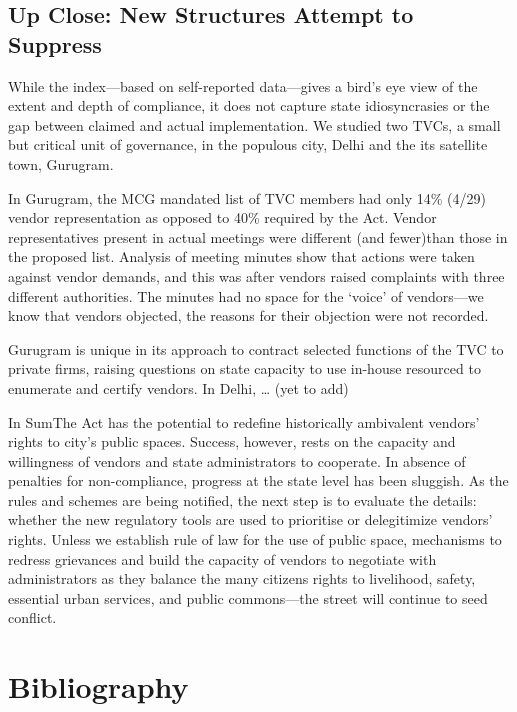 \documentclass[a4paper, 12pt, twoside]{article}
\begin{document}
{{\subsection*{Up Close: New Structures Attempt to Suppress}
While the index—based on self-reported data—gives a bird’s eye view of the extent and depth of compliance, it does not capture state idiosyncrasies or the gap between claimed and actual implementation. We studied two TVCs, a small but critical unit of governance, in the populous city, Delhi and the its satellite town, Gurugram.

In Gurugram, the MCG mandated list of TVC members had only 14\% (4/29) vendor representation as opposed to 40\% required by the Act. Vendor representatives present in actual meetings were different (and fewer)than those in the proposed list. Analysis of meeting minutes show that actions were taken against vendor demands, and this was after vendors raised complaints with three different authorities. The minutes had no space for the ‘voice’ of vendors—we know that vendors objected, the reasons for their objection were not recorded.

Gurugram is unique in its approach to contract selected functions of the TVC to private firms, raising questions on state capacity to use in-house resourced to enumerate and certify vendors.
In Delhi, … (yet to add)

In SumThe Act has the potential to redefine historically ambivalent vendors’ rights to  city’s public spaces. Success, however, rests on the capacity and willingness of vendors and state administrators to cooperate. In absence of penalties for non-compliance, progress at the state level has been sluggish. As the rules and schemes are being notified, the next step is to evaluate the details: whether the new regulatory tools are used to prioritise or delegitimize vendors’ rights. Unless we establish rule of law for the use of public space, mechanisms to redress grievances and build the capacity of vendors to negotiate with administrators as they balance the many citizens rights to livelihood, safety, essential urban services, and public commons—the street will continue to seed conflict.


\newpage
\section*{Bibliography}
\printbibliography[heading=none]

}}
\end{document}
